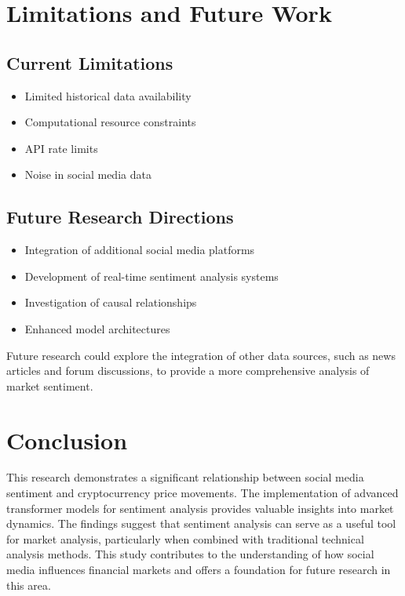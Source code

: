 \documentclass[12pt,a4paper]{report}
\begin{document}
\chapter{Limitations and Future Work}
\section{Current Limitations}
\begin{itemize}
    \item Limited historical data availability
    \item Computational resource constraints
    \item API rate limits
    \item Noise in social media data
\end{itemize}

\section{Future Research Directions}
\begin{itemize}
    \item Integration of additional social media platforms
    \item Development of real-time sentiment analysis systems
    \item Investigation of causal relationships
    \item Enhanced model architectures
\end{itemize}
Future research could explore the integration of other data sources, such as news articles and forum discussions, to provide a more comprehensive analysis of market sentiment.

\chapter{Conclusion}
This research demonstrates a significant relationship between social media
sentiment and cryptocurrency price movements. The implementation of advanced
transformer models for sentiment analysis provides valuable insights into
market dynamics. The findings suggest that sentiment analysis can serve as a
useful tool for market analysis, particularly when combined with traditional
technical analysis methods. This study contributes to the understanding of how
social media influences financial markets and offers a foundation for future
research in this area.
\end{document}
